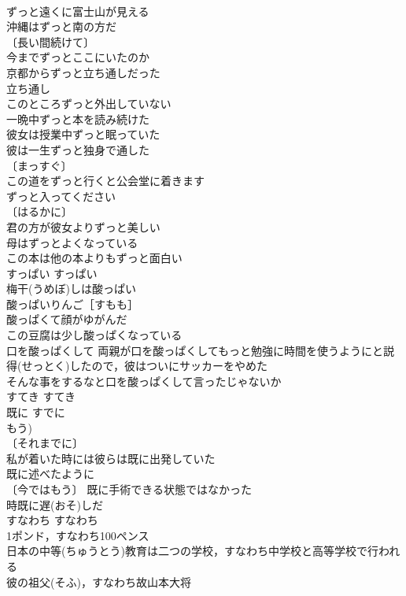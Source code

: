 \documentclass[8pt]{extreport}
\begin{document}
\begin{CJK}{UTF8}{min}
\\	ずっと遠くに富士山が見える 
\\	沖縄はずっと南の方だ 
\\	〔長い間続けて〕
\\	今までずっとここにいたのか 
\\	京都からずっと立ち通しだった 
\\	立ち通し　
\\	このところずっと外出していない 
\\	一晩中ずっと本を読み続けた 
\\	彼女は授業中ずっと眠っていた 
\\	彼は一生ずっと独身で通した 
\\	〔まっすぐ〕
\\	この道をずっと行くと公会堂に着きます 
\\	ずっと入ってください 
\\	〔はるかに〕
\\	君の方が彼女よりずっと美しい 
\\	母はずっとよくなっている 
\\	この本は他の本よりもずっと面白い 
\\	すっぱい	すっぱい	
\\	梅干(うめぼ)しは酸っぱい 
\\	酸っぱいりんご［すもも］ 
\\	酸っぱくて顔がゆがんだ 
\\	この豆腐は少し酸っぱくなっている 
\\	口を酸っぱくして 両親が口を酸っぱくしてもっと勉強に時間を使うようにと説得(せっとく)したので，彼はついにサッカーをやめた 
\\	そんな事をするなと口を酸っぱくして言ったじゃないか 
\\	すてき	すてき	
\\	既に	すでに	
\\	もう) 
\\	〔それまでに〕
\\	私が着いた時には彼らは既に出発していた 
\\	既に述べたように 
\\	〔今ではもう〕 既に手術できる状態ではなかった 
\\	時既に遅(おそ)しだ 
\\	すなわち	すなわち	
\\	1ポンド，すなわち100ペンス 
\\	日本の中等(ちゅうとう)教育は二つの学校，すなわち中学校と高等学校で行われる 
\\	彼の祖父(そふ)，すなわち故山本大将 

\end{CJK}
\end{document}
